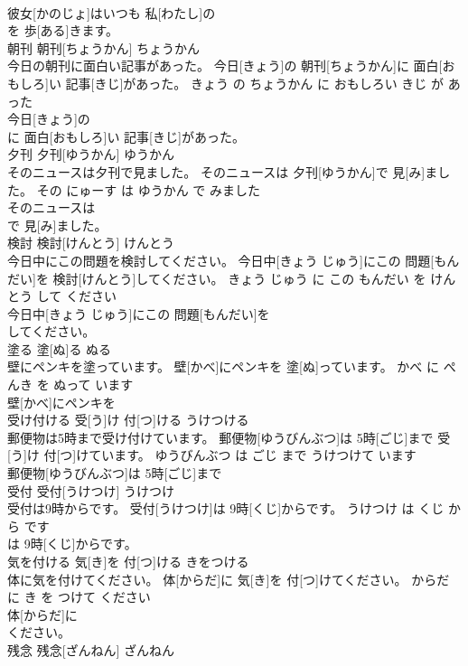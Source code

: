 \documentclass[8pt]{extreport}
\begin{document}
\begin{CJK}{UTF8}{min}
\\	彼女[かのじょ]はいつも 私[わたし]の
\\	を 歩[ある]きます。			
\\	朝刊	朝刊[ちょうかん]	ちょうかん	
\\	今日の朝刊に面白い記事があった。	今日[きょう]の 朝刊[ちょうかん]に 面白[おもしろ]い 記事[きじ]があった。	きょう の ちょうかん に おもしろい きじ が あった	
\\	今日[きょう]の
\\	に 面白[おもしろ]い 記事[きじ]があった。			
\\	夕刊	夕刊[ゆうかん]	ゆうかん	
\\	そのニュースは夕刊で見ました。	そのニュースは 夕刊[ゆうかん]で 見[み]ました。	その にゅーす は ゆうかん で みました	
\\	そのニュースは
\\	で 見[み]ました。			
\\	検討	検討[けんとう]	けんとう	
\\	今日中にこの問題を検討してください。	今日中[きょう じゅう]にこの 問題[もんだい]を 検討[けんとう]してください。	きょう じゅう に この もんだい を けんとう して ください	
\\	今日中[きょう じゅう]にこの 問題[もんだい]を
\\	してください。			
\\	塗る	塗[ぬ]る	ぬる	
\\	壁にペンキを塗っています。	壁[かべ]にペンキを 塗[ぬ]っています。	かべ に ぺんき を ぬって います	
\\	壁[かべ]にペンキを
\\	受け付ける	受[う]け 付[つ]ける	うけつける	
\\	郵便物は5時まで受け付けています。	郵便物[ゆうびんぶつ]は 5時[ごじ]まで 受[う]け 付[つ]けています。	ゆうびんぶつ は ごじ まで うけつけて います	
\\	郵便物[ゆうびんぶつ]は 5時[ごじ]まで
\\	受付	受付[うけつけ]	うけつけ	
\\	受付は9時からです。	受付[うけつけ]は 9時[くじ]からです。	うけつけ は くじ から です	
\\	は 9時[くじ]からです。			
\\	気を付ける	気[き]を 付[つ]ける	きをつける	
\\	体に気を付けてください。	体[からだ]に 気[き]を 付[つ]けてください。	からだ に き を つけて ください	
\\	体[からだ]に
\\	ください。			
\\	残念	残念[ざんねん]	ざんねん	

\end{CJK}
\end{document}

